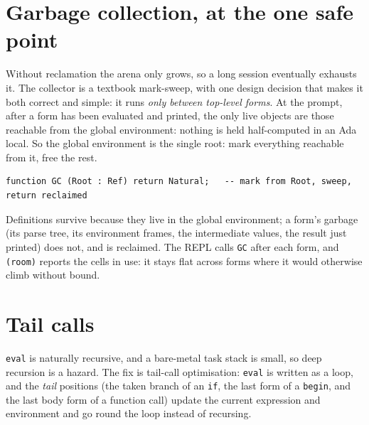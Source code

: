 \section{Garbage collection, at the one safe point}

Without reclamation the arena only grows, so a long session eventually exhausts it.
The collector is a textbook mark-sweep, with one design decision that makes it both
correct and simple: it runs \emph{only between top-level forms}. At the prompt,
after a form has been evaluated and printed, the only live objects are those
reachable from the global environment: nothing is held half-computed in an Ada
local. So the global environment is the single root: mark everything reachable from
it, free the rest.

\begin{lstlisting}
function GC (Root : Ref) return Natural;   -- mark from Root, sweep, return reclaimed
\end{lstlisting}

Definitions survive because they live in the global environment; a form's garbage
(its parse tree, its environment frames, the intermediate values, the result just
printed) does not, and is reclaimed. The REPL calls \texttt{GC} after each form,
and \texttt{(room)} reports the cells in use: it stays flat across forms where it
would otherwise climb without bound.


\section{Tail calls}

\texttt{eval} is naturally recursive, and a bare-metal task stack is small, so deep
recursion is a hazard. The fix is tail-call optimisation: \texttt{eval} is written
as a loop, and the \emph{tail} positions (the taken branch of an \texttt{if}, the
last form of a \texttt{begin}, and the last body form of a function call) update
the current expression and environment and go round the loop instead of recursing.


